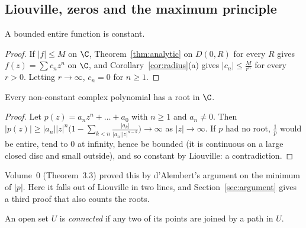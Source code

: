 \subsection*{Liouville, zeros and the maximum principle}

\begin{theorem}[Liouville]\label{thm:liouville}
A bounded entire function is constant.
\end{theorem}
\begin{proof}
If $|f|\le M$ on $\C$, Theorem~\ref{thm:analytic} on $D(0,R)$ for every $R$ gives $f(z)=\sum c_nz^n$ on $\C$, and Corollary~\ref{cor:radius}(a) gives $|c_n|\le\frac M{r^n}$ for
every $r>0$. Letting $r\to\infty$, $c_n=0$ for $n\ge1$.
\end{proof}

\begin{corollary}\label{cor:fta}
Every non-constant complex polynomial has a root in $\C$.
\end{corollary}
\begin{proof}
Let $p(z)=a_nz^n+\dots+a_0$ with $n\ge1$ and $a_n\ne0$. Then $|p(z)|\ge|a_n||z|^n\bigl(1-\sum_{k<n}\frac{|a_k|}{|a_n||z|^{n-k}}\bigr)\to\infty$ as $|z|\to\infty$. If $p$
had no root, $\frac1p$ would be entire, tend to $0$ at infinity, hence be bounded (it is continuous on a large closed disc and small outside),
and so constant by Liouville: a contradiction.
\end{proof}

Volume~0 (Theorem~3.3) proved this by d'Alembert's argument on the minimum of $|p|$. Here it falls out of Liouville in two
lines, and Section~\ref{sec:argument} gives a third proof that also counts the roots.

An open set $U$ is \emph{connected} if any two of its points are joined by a path in $U$.

